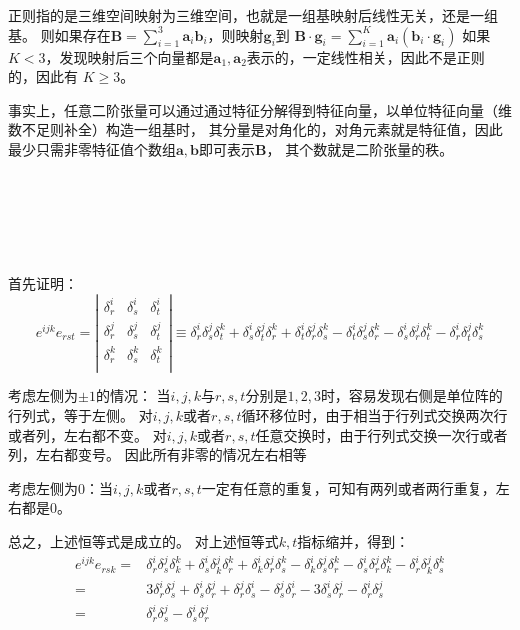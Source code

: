 \documentclass[UTF8,zihao=5]{ctexart}
\newcommand{\bm}[1]{{\mathbf{#1}}}
\begin{document}
正则指的是三维空间映射为三维空间，也就是一组基映射后线性无关，还是一组基。
则如果存在$\bm{B}=\sum_{i=1}^{3}{\bm{a}_i\bm{b}_i}$，则映射$\bm{g}_i$到
$\bm{B}\cdot\bm{g}_i=\sum_{i=1}^{K}{\bm{a}_i\left(\bm{b}_i\cdot\bm{g}_i\right)}$
如果$K<3$，发现映射后三个向量都是$\bm{a}_1,\bm{a}_2$表示的，一定线性相关，因此不是正则的，因此有
$K\ge3$。

事实上，任意二阶张量可以通过通过特征分解得到特征向量，以单位特征向量（维数不足则补全）构造一组基时，
其分量是对角化的，对角元素就是特征值，因此最少只需非零特征值个数组$\bm{a}, \bm{b}$即可表示$\bm{B}$，
其个数就是二阶张量的秩。



\ 

\ 

\ 


首先证明：
\begin{equation*}
    e^{ijk}e_{rst}=
    \left|
    \begin{matrix}
        \delta^i_r & \delta^i_s & \delta^i_t \\
        \delta^j_r & \delta^j_s & \delta^j_t \\
        \delta^k_r & \delta^k_s & \delta^k_t \\
    \end{matrix}
    \right|
    \equiv 
    \delta^i_r\delta^j_s\delta^k_t +
    \delta^i_s\delta^j_t\delta^k_r +
    \delta^i_t\delta^j_r\delta^k_s -
    \delta^i_t\delta^j_s\delta^k_r -
    \delta^i_s\delta^j_r\delta^k_t -
    \delta^i_r\delta^j_t\delta^k_s
\end{equation*}

考虑左侧为$\pm 1$的情况：
当$i,j,k$与$r,s,t$分别是$1,2,3$时，容易发现右侧是单位阵的行列式，等于左侧。
对$i,j,k$或者$r,s,t$循环移位时，由于相当于行列式交换两次行或者列，左右都不变。
对$i,j,k$或者$r,s,t$任意交换时，由于行列式交换一次行或者列，左右都变号。
因此所有非零的情况左右相等

考虑左侧为$0$：当$i,j,k$或者$r,s,t$一定有任意的重复，可知有两列或者两行重复，左右都是0。

总之，上述恒等式是成立的。
对上述恒等式$k,t$指标缩并，得到：
\begin{equation*}
    \begin{aligned}
        e^{ijk}e_{rsk}=&
    \delta^i_r\delta^j_s\delta^k_k +
    \delta^i_s\delta^j_k\delta^k_r +
    \delta^i_k\delta^j_r\delta^k_s -
    \delta^i_k\delta^j_s\delta^k_r -
    \delta^i_s\delta^j_r\delta^k_k -
    \delta^i_r\delta^j_k\delta^k_s\\
    =&
    3\delta^i_r\delta^j_s +
    \delta^i_s\delta^j_r +
    \delta^j_r\delta^i_s -
    \delta^j_s\delta^i_r -
    3\delta^i_s\delta^j_r -
    \delta^i_r\delta^j_s 
    \\
    =&\delta^i_r\delta^j_s -
    \delta^i_s\delta^j_r 
    \end{aligned}
\end{equation*}
\end{document}
